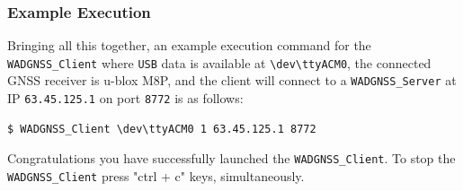\subsubsection{Example Execution}

Bringing all this  together, an example execution command for the \texttt{WADGNSS\_Client} where \texttt{USB} data is available at \texttt{\textbackslash dev\textbackslash ttyACM0}, the connected GNSS receiver is u-blox M8P, and the client will connect to a \texttt{WADGNSS\_Server} at IP \texttt{63.45.125.1} on port \texttt{8772} is as follows:
%
\begin{verbatim}
$ WADGNSS_Client \dev\ttyACM0 1 63.45.125.1 8772 
\end{verbatim}
%
Congratulations you have successfully launched the \texttt{WADGNSS\_Client}. To stop the \texttt{WADGNSS\_Client} press "ctrl + c" keys, simultaneously.


